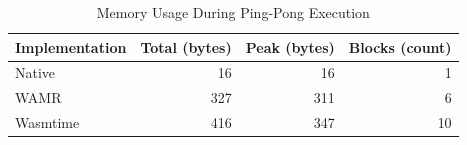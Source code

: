 \begin{table}[htbp]
    \centering
    \caption{Memory Usage During Ping-Pong Execution}
    \label{tab:memory-execution}
    \begin{tabular}{lrrr}
        \toprule
        \textbf{Implementation} & \textbf{Total (bytes)} & \textbf{Peak (bytes)} & \textbf{Blocks (count)} \\
        \midrule
        Native        & 16   & 16  & 1 \\
        WAMR          & 327  & 311 & 6 \\
        Wasmtime      & 416  & 347 & 10 \\
        \bottomrule
    \end{tabular}
\end{table}








